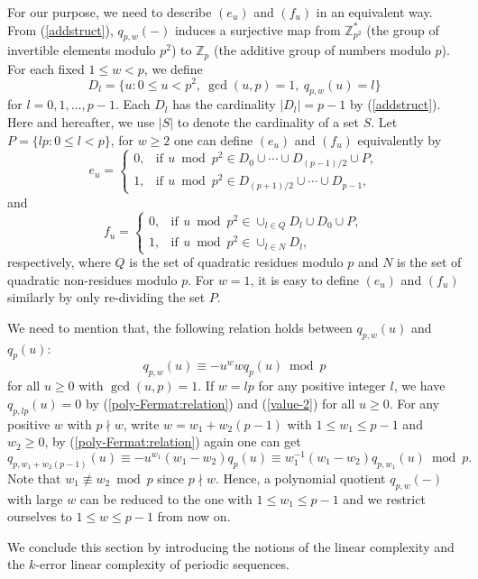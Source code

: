 \documentclass [11pt,a4paper]{article}
\def\Z{\mathbb{Z}}
\begin{document}
For our purpose, we need to describe $(e_u)$  and $(f_u)$ in an equivalent way. From (\ref{addstruct}),
$q_{p,w}(-)$ induces a surjective map from $\Z_{p^2}^*$ (the group of invertible
elements modulo $p^2$) to $\Z_p$ (the additive group of numbers modulo $p$). For each fixed $1\le w<p$, we define
$$
D_l=\{u: 0\le u< p^2,~ \gcd(u,p)=1,~q_{p,w}(u)=l\}
$$
for $l=0,1,\ldots,p-1$. Each $D_l$ has the cardinality $|D_l|=p-1$ by (\ref{addstruct}). Here and hereafter, we use $|S|$ to denote the cardinality of a set $S$. Let $P=\{lp: 0\le l< p\}$, for $w\ge 2$
one can define $(e_u)$  and $(f_u)$ equivalently by
$$
e_u=\left\{
\begin{array}{ll}
0, & \mathrm{if}\,\ u \bmod {p^2}\in D_0 \cup \cdots \cup D_{(p-1)/2} \cup P,\\
1, & \mathrm{if}\,\ u\bmod {p^2} \in D_{(p+1)/2} \cup \cdots \cup D_{p-1},
\end{array}
\right.
$$
and
$$
f_u=\left\{
\begin{array}{ll}
0, & \mathrm{if}\,\ u\bmod {p^2}\in \cup_{l\in Q} D_l  \cup D_0\cup P,\\
1, & \mathrm{if}\,\ u\bmod {p^2}\in \cup_{l\in N} D_{l},
\end{array}
\right.
$$
respectively, where $Q$ is the set of quadratic residues modulo $p$ and $N$ is the set of quadratic non-residues modulo $p$.
For $w=1$, it is easy to  define $(e_u)$  and $(f_u)$ similarly by only re-dividing the set $P$.




We need to mention that,  the following relation holds  between
$q_{p,w}(u)$ and $q_{p}(u)$:
\begin{equation}\label{poly-Fermat:relation}
q_{p,w}(u)\equiv -u^wwq_{p}(u) \bmod p
\end{equation}
for all $u\ge 0$ with $\gcd(u,p)=1$.
If $w=lp$ for any positive integer $l$, we have $q_{p,lp}(u)=0$ by
(\ref{poly-Fermat:relation}) and (\ref{value-2})  for all $u\ge 0$.
For any positive $w$ with $p\nmid w$, write $w=w_1+w_2(p-1)$ with
$1\le w_1\le p-1$ and $w_2\ge 0$, by (\ref{poly-Fermat:relation})
again one can get
$$
q_{p,w_1+w_2(p-1)}(u)\equiv -u^{w_1}(w_1-w_2)q_{p}(u)\equiv
w_1^{-1}(w_1-w_2)q_{p,w_1}(u) \bmod p.
$$
Note that $w_1\not\equiv w_2
\bmod p$ since  $p\nmid w$. Hence, a polynomial quotient $q_{p,w}(-)$ with large $w$ can be reduced to the one with $1\le w_1\le p-1$ and we restrict ourselves to
$1\le w\le p-1$ from now on.


We conclude this section by introducing the notions of the linear complexity and the $k$-error linear complexity of periodic sequences.
\end{document}
